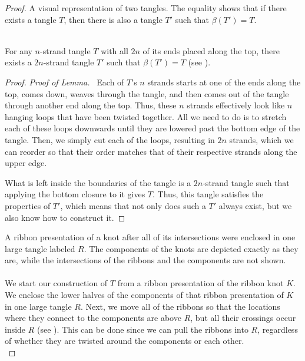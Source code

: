 \documentclass{ws-jktr}
\begin{document}
\begin{proof}
{A visual representation of two tangles.
The equality shows that if there exists a tangle $T$, then there is also a
tangle $T'$ such that $\beta(T')=T$.}\\\\

\begin{lemma}
For any $n$-strand tangle $T$ with all $2n$ of its ends placed along the top,
there exists a $2n$-strand tangle $T'$ such that $\beta(T')=T$ (see \figLemma).
\end{lemma}
\vspace{-1.5em}
\begin{proof}\textit{Proof of Lemma.~}
Each of $T$'s $n$ strands starts at one of the ends along the top, comes down,
weaves through the tangle, and then comes out of the tangle through another end
along the top.
Thus, these $n$ strands effectively look like $n$ hanging loops that have been
twisted together.
All we need to do is to stretch each of these loops downwards until they are
lowered past the bottom edge of the tangle.
Then, we simply cut each of the loops, resulting in $2n$ strands, which we can
reorder so that their order matches that of their respective strands along the
upper edge.

What is left inside the boundaries of the tangle is a $2n$-strand tangle such
that applying the bottom closure to it gives $T$.
Thus, this tangle satisfies the properties of $T'$, which means that not only
does such a $T'$ always exist, but we also know how to construct it.
\end{proof}

{A ribbon presentation of a knot after all of its intersections were enclosed in
one large tangle labeled $R$.
The components of the knots are depicted exactly as they are, while the
intersections of the ribbons and the components are not shown.}\\\\

We start our construction of $T$ from a ribbon presentation of the ribbon knot
$K$.
We enclose the lower halves of the components of that ribbon presentation of $K$
in one large tangle $R$.
Next, we move all of the ribbons so that the locations where they connect to the
components are above $R$, but all their crossings occur inside $R$
(see \figLowered).
This can be done since we can pull the ribbons into $R$, regardless of whether
they are twisted around the components or each other.\\


\end{proof}
\end{document}
